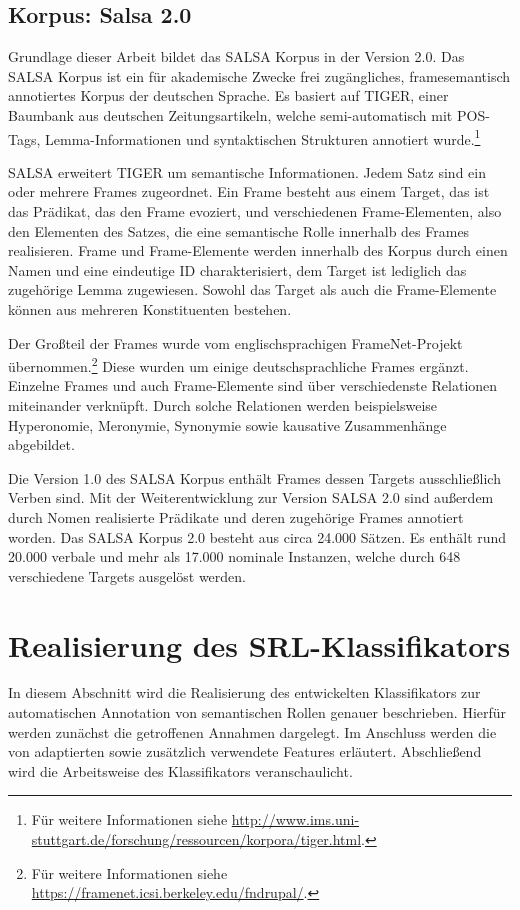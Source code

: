 \documentclass[12pt]{article}
\begin{document}
\subsection{Korpus: Salsa 2.0}
Grundlage dieser Arbeit bildet das SALSA Korpus in der Version 2.0. Das SALSA Korpus ist ein für akademische Zwecke frei zugängliches, framesemantisch annotiertes Korpus der deutschen Sprache. Es basiert auf TIGER\citep{brants_tiger_2002, tiger}, einer Baumbank aus deutschen Zeitungsartikeln, welche semi-automatisch mit POS-Tags, Lemma-Informationen und syntaktischen Strukturen annotiert wurde.\footnote{Für weitere Informationen siehe \url{http://www.ims.uni-stuttgart.de/forschung/ressourcen/korpora/tiger.html}.}

SALSA erweitert TIGER um semantische Informationen. Jedem Satz sind ein oder mehrere Frames zugeordnet. Ein Frame besteht aus einem Target, das ist das Prädikat, das den Frame evoziert, und verschiedenen Frame-Elementen, also den Elementen des Satzes, die eine semantische Rolle innerhalb des Frames realisieren. Frame und Frame-Elemente werden innerhalb des Korpus durch einen Namen und eine eindeutige ID charakterisiert, dem Target ist lediglich das zugehörige Lemma zugewiesen. Sowohl das Target als auch die Frame-Elemente können aus mehreren Konstituenten bestehen.

Der Großteil der Frames wurde vom englischsprachigen FrameNet-Projekt\citep{baker_berkeley_1998} übernommen.\footnote{Für weitere Informationen siehe \url{https://framenet.icsi.berkeley.edu/fndrupal/}.} Diese wurden um einige deutschsprachliche Frames ergänzt. Einzelne Frames und auch Frame-Elemente sind über verschiedenste Relationen miteinander verknüpft. Durch solche Relationen werden beispielsweise Hyperonomie, Meronymie, Synonymie sowie kausative Zusammenhänge abgebildet.

Die Version 1.0 des SALSA Korpus\citep{burchardt_salsa_2006} enthält Frames dessen Targets ausschließlich Verben sind. Mit der Weiterentwicklung zur Version SALSA 2.0\citep{rehbein_adding_2012} sind außerdem durch Nomen realisierte Prädikate und deren zugehörige Frames annotiert worden. Das SALSA Korpus 2.0 besteht aus circa 24.000 Sätzen. Es enthält rund 20.000 verbale und mehr als 17.000 nominale Instanzen, welche durch 648 verschiedene Targets ausgelöst werden.

\section{Realisierung des SRL-Klassifikators}
In diesem Abschnitt wird die Realisierung des entwickelten Klassifikators zur automatischen Annotation von semantischen Rollen genauer beschrieben. Hierfür werden zunächst die getroffenen Annahmen dargelegt. Im Anschluss werden die von \cite{gildea} adaptierten sowie zusätzlich verwendete Features erläutert. Abschließend wird die Arbeitsweise des Klassifikators veranschaulicht.
\end{document}

